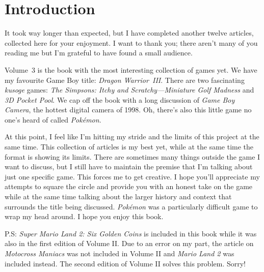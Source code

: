 \documentclass{book}
\begin{document}
\chapter*{Introduction}
It took way longer than expected, but I have completed another twelve articles, collected here for your enjoyment. I want to thank you; there aren’t many of you reading me but I’m grateful to have found a small audience.\par
Volume~3 is the book with the most interesting collection of games yet. We have my favourite Game Boy title: \emph{Dragon Warrior~III}. There are two fascinating \emph{kusoge} games: \emph{The Simpsons: Itchy and Scratchy—Miniature Golf Madness} and \emph{3D Pocket Pool}. We cap off the book with a long discussion of \emph{Game Boy Camera}, the hottest digital camera of 1998. Oh, there’s also this little game no one’s heard of called \emph{Pokémon}.\par
At this point, I feel like I’m hitting my stride and the limits of this project at the same time. This collection of articles is my best yet, while at the same time the format is showing its limits. There are sometimes many things outside the game I want to discuss, but I still have to maintain the premise that I’m talking about just one specific game. This forces me to get creative. I hope you’ll appreciate my attempts to square the circle and provide you with an honest take on the game while at the same time talking about the larger history and context that surrounds the title being discussed. \emph{Pokémon} was a particularly difficult game to wrap my head around. I hope you enjoy this book.\par
P.S: \emph{Super Mario Land 2: Six Golden Coins} is included in this book while it was also in the first edition of Volume II. Due to an error on my part, the article on \emph{Motocross Maniacs} was not included in Volume II and \emph{Mario Land 2} was included instead. The second edition of Volume II solves this problem. Sorry!\par
\end{document}
